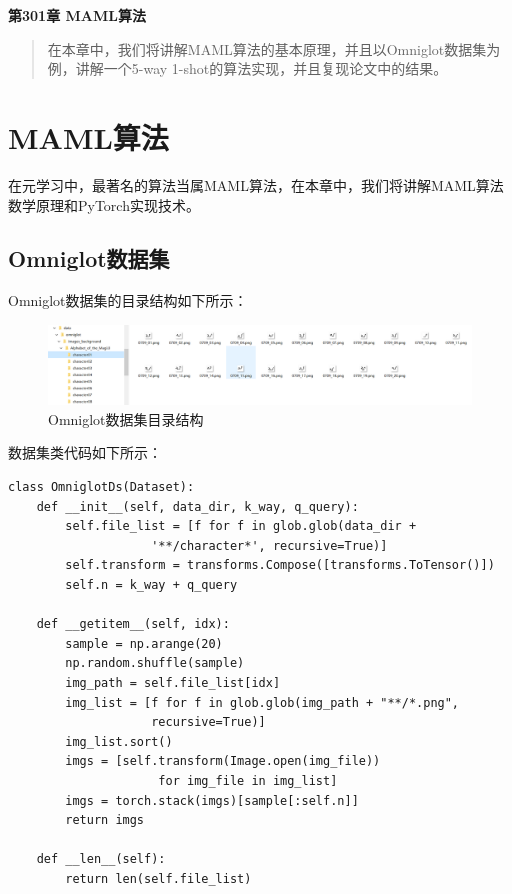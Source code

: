 \newpage
\maketitle
\begin{center}
\Large \textbf{第301章 MAML算法} \quad 
\end{center}
\begin{abstract}
在本章中，我们将讲解MAML算法的基本原理，并且以Omniglot数据集为例，讲解一个5-way 1-shot的算法实现，并且复现论文中的结果。
\end{abstract}
\section{MAML算法}
在元学习中，最著名的算法当属MAML算法，在本章中，我们将讲解MAML算法数学原理和PyTorch实现技术。
\subsection{Omniglot数据集}
Omniglot数据集的目录结构如下所示：
\begin{figure}[H]
	\caption{Omniglot数据集目录结构}
	\label{f000116}
	\centering
	\includegraphics[width=15cm]{images/f000116}
\end{figure}
数据集类代码如下所示：
\begin{lstlisting}
class OmniglotDs(Dataset):
    def __init__(self, data_dir, k_way, q_query):
        self.file_list = [f for f in glob.glob(data_dir + 
                    '**/character*', recursive=True)]
        self.transform = transforms.Compose([transforms.ToTensor()])
        self.n = k_way + q_query

    def __getitem__(self, idx):
        sample = np.arange(20)
        np.random.shuffle(sample)
        img_path = self.file_list[idx]
        img_list = [f for f in glob.glob(img_path + "**/*.png", 
                    recursive=True)]
        img_list.sort()
        imgs = [self.transform(Image.open(img_file))
                     for img_file in img_list]
        imgs = torch.stack(imgs)[sample[:self.n]]
        return imgs

    def __len__(self):
        return len(self.file_list)   
\end{lstlisting}
